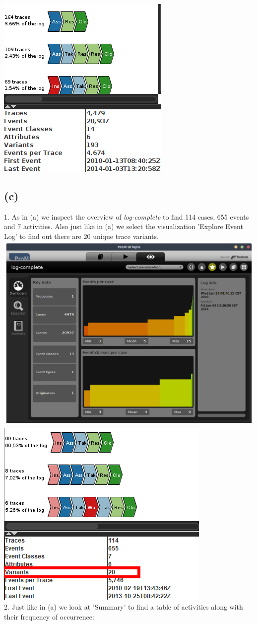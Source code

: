 \documentclass[../../main.tex]{subfiles}
\begin{document}
\includegraphics[width=0.5\columnwidth]{img/ProM_b_filter_log.png}\\

\subsection*{(c)}
1. As in (a) we inspect the overview of \textit{log-complete} to find 114 cases, 655 events and 7 activities. Also just like in (a) we select the visualization 'Explore Event Log' to find out there are 20 unique trace variants.\\
\includegraphics[width=0.6\columnwidth]{img/ProM_c_overview.png}
\includegraphics[width=0.4\columnwidth]{img/ProM_c_traces.png}\\
2. Just like in (a) we look at 'Summary' to find a table of activities along with their frequency of occurrence:\\
\end{document}
